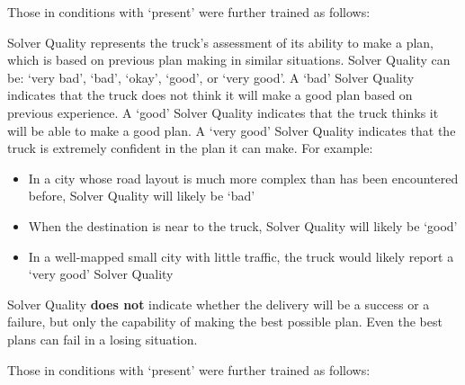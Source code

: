 Those in conditions with \xQ{} `present' were further trained as follows:

\begin{quoting}
    Solver Quality represents the truck's assessment of its ability to make a plan, which is based on previous plan making in similar situations. Solver Quality can be: `very bad', `bad', `okay', `good', or `very good'. A `bad' Solver Quality indicates that the truck does not think it will make a good plan based on previous experience. A `good' Solver Quality indicates that the truck thinks it will be able to make a good plan. A `very good' Solver Quality indicates that the truck is extremely confident in the plan it can make. For example:

    \begin{itemize}
        \item In a city whose road layout is much more complex than has been encountered before, Solver Quality will likely be `bad'
        \item When the destination is near to the truck, Solver Quality will likely be `good'
        \item In a well-mapped small city with little traffic, the truck would likely report a `very good' Solver Quality
    \end{itemize}

    Solver Quality \textbf{does not} indicate whether the delivery will be a success or a failure, but only the capability of making the best possible plan. Even the best plans can fail in a losing situation.

\end{quoting}

Those in conditions with \xP{} `present' were further trained as follows:

